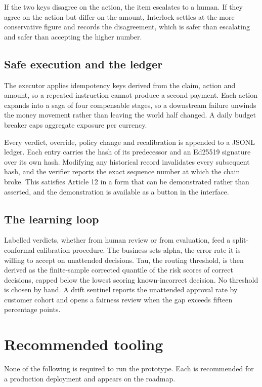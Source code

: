 \documentclass[10pt]{article}
\begin{document}
If the two keys disagree on the action, the item escalates to a human. If they agree on
the action but differ on the amount, Interlock settles at the more conservative figure
and records the disagreement, which is safer than escalating and safer than accepting the
higher number.

\subsection{Safe execution and the ledger}

The executor applies idempotency keys derived from the claim, action and amount, so a
repeated instruction cannot produce a second payment. Each action expands into a saga of
four compensable stages, so a downstream failure unwinds the money movement rather than
leaving the world half changed. A daily budget breaker caps aggregate exposure per
currency.

Every verdict, override, policy change and recalibration is appended to a JSONL ledger.
Each entry carries the hash of its predecessor and an Ed25519 signature over its own hash.
Modifying any historical record invalidates every subsequent hash, and the verifier
reports the exact sequence number at which the chain broke. This satisfies Article 12 in a
form that can be demonstrated rather than asserted, and the demonstration is available as
a button in the interface.

\subsection{The learning loop}

Labelled verdicts, whether from human review or from evaluation, feed a split-conformal
calibration procedure. The business sets alpha, the error rate it is willing to accept on
unattended decisions. Tau, the routing threshold, is then derived as the finite-sample
corrected quantile of the risk scores of correct decisions, capped below the lowest
scoring known-incorrect decision. No threshold is chosen by hand. A drift sentinel reports
the unattended approval rate by customer cohort and opens a fairness review when the gap
exceeds fifteen percentage points.

\section{Recommended tooling}

None of the following is required to run the prototype. Each is recommended for a
production deployment and appears on the roadmap.
\end{document}
